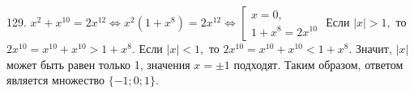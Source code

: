 129. $x^2+x^{10}=2x^{12}\Leftrightarrow x^2(1+x^8)=2x^{12}\Leftrightarrow \left[\begin{array}{l} x=0,\\ 1+x^8=2x^{10} \end{array}\right.$ Если $|x|>1,$ то $2x^{10}=x^{10}+x^{10}>1+x^8.$ Если $|x|<1,$ то $2x^{10}=x^{10}+x^{10}<1+x^8.$ Значит, $|x|$ может быть равен только 1, значения $x=\pm1$ подходят. Таким образом, ответом является множество $\{-1;0;1\}.$\\
